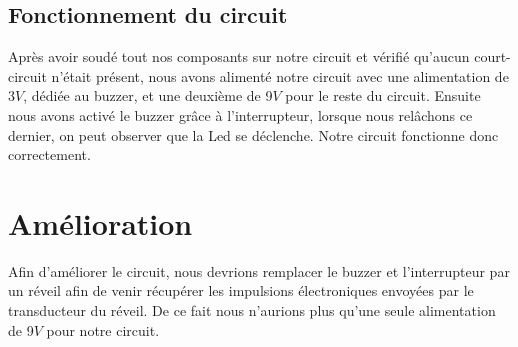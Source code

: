 \section{Fonctionnement du circuit}

Après avoir soudé tout nos composants sur notre circuit et vérifié qu'aucun court-circuit n'était présent, nous avons alimenté notre circuit avec une alimentation de 3$V$, dédiée au buzzer, et une deuxième de 9$V$ pour le reste du circuit. Ensuite nous avons activé le buzzer grâce à l'interrupteur, lorsque nous relâchons ce dernier, on peut observer que la Led se déclenche. Notre circuit fonctionne donc correctement.

\chapter{Amélioration}

Afin d'améliorer le circuit, nous devrions remplacer le buzzer et l'interrupteur par un réveil afin de venir récupérer les impulsions électroniques envoyées par le transducteur du réveil. De ce fait nous n'aurions plus qu'une seule alimentation de 9$V$ pour notre circuit.





